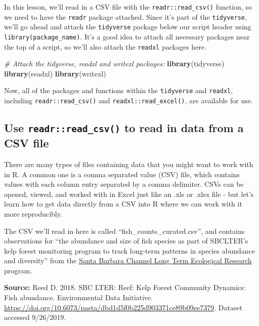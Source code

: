 \documentclass[]{book}
\newenvironment{Shaded}{\begin{snugshade}}{\end{snugshade}}
\newcommand{\CommentTok}[1]{\textcolor[rgb]{0.56,0.35,0.01}{\textit{#1}}}
\newcommand{\KeywordTok}[1]{\textcolor[rgb]{0.13,0.29,0.53}{\textbf{#1}}}
\newcommand{\NormalTok}[1]{#1}
\begin{document}
In this lesson, we'll read in a CSV file with the \texttt{readr::read\_csv()} function, so we need to have the \texttt{readr} package attached. Since it's part of the \texttt{tidyverse}, we'll go ahead and attach the \texttt{tidyverse} package below our script header using \texttt{library(package\_name)}. It's a good idea to attach all necessary packages near the top of a script, so we'll also attach the \texttt{readxl} packages here.

\begin{Shaded}
\begin{Highlighting}[]
\CommentTok{# Attach the tidyverse, readxl and writexl packages:}
\KeywordTok{library}\NormalTok{(tidyverse)}
\KeywordTok{library}\NormalTok{(readxl)}
\KeywordTok{library}\NormalTok{(writexl)}
\end{Highlighting}
\end{Shaded}

Now, all of the packages and functions within the \texttt{tidyverse} and \texttt{readxl}, including \texttt{readr::read\_csv()} and \texttt{readxl::read\_excel()}, are available for use.

\hypertarget{use-readrread_csv-to-read-in-data-from-a-csv-file}{%
\subsection{\texorpdfstring{Use \texttt{readr::read\_csv()} to read in data from a CSV file}{Use readr::read\_csv() to read in data from a CSV file}}\label{use-readrread_csv-to-read-in-data-from-a-csv-file}}

There are many types of files containing data that you might want to work with in R. A common one is a comma separated value (CSV) file, which contains values with each column entry separated by a comma delimiter. CSVs can be opened, viewed, and worked with in Excel just like an .xls or .xlsx file - but let's learn how to get data directly from a CSV into R where we can work with it more reproducibly.

The CSV we'll read in here is called ``fish\_counts\_curated.csv'', and contains observations for ``the abundance and size of fish species as part of SBCLTER's kelp forest monitoring program to track long-term patterns in species abundance and diversity'' from the \href{http://sbc.lternet.edu/}{Santa Barbara Channel Long Term Ecological Research} program.

\textbf{Source:} Reed D. 2018. SBC LTER: Reef: Kelp Forest Community Dynamics: Fish abundance. Environmental Data Initiative. \url{https://doi.org/10.6073/pasta/dbd1d5f0b225d903371ce89b09ee7379}. Dataset accessed 9/26/2019.
\end{document}
